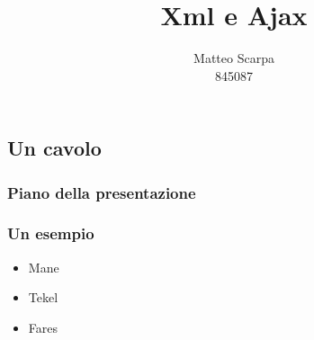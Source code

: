 \documentclass{beamer}
\title{Xml e Ajax}
\author{Matteo Scarpa\\ 845087}
\date{}
\institute{Università Ca'Foscari}
\begin{document}
\begin{frame}
   \maketitle
\end{frame}

\begin{frame}
   \section{Un cavolo}
   \frametitle{Piano della presentazione}
   \tableofcontents
\end{frame}

\begin{frame}
   \frametitle{Un esempio}
   \begin{itemize}
      \item<1-> Mane
      \item<2-> Tekel
      \item<3-> Fares
   \end{itemize}
\end{frame}
\end{document}
